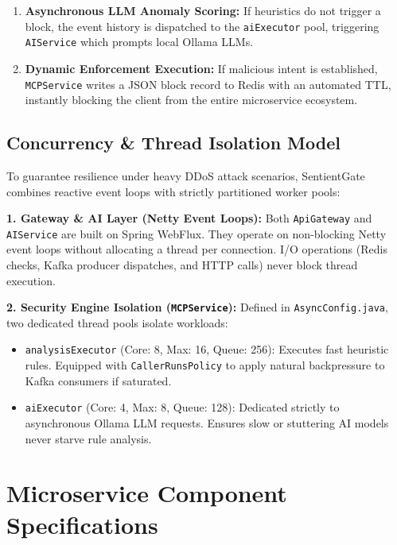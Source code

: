 \documentclass[12pt, a4paper]{article}
\newcommand{\tech}[1]{\texttt{\color{accentblue}#1}}
\newcommand{\service}[1]{\texttt{\color{accentteal}#1}}
\begin{document}
\begin{enumerate}[leftmargin=*, itemsep=5pt]
    \item \textbf{Asynchronous LLM Anomaly Scoring:} If heuristics do not trigger a block, the event history is dispatched to the \texttt{aiExecutor} pool, triggering \service{AIService} which prompts local Ollama LLMs.
    \item \textbf{Dynamic Enforcement Execution:} If malicious intent is established, \service{MCPService} writes a JSON block record to Redis with an automated TTL, instantly blocking the client from the entire microservice ecosystem.
\end{enumerate}

\subsection{Concurrency \& Thread Isolation Model}

To guarantee resilience under heavy DDoS attack scenarios, SentientGate combines reactive event loops with strictly partitioned worker pools:

\begin{tcolorbox}[solutionbox]
\textbf{1. Gateway \& AI Layer (Netty Event Loops):}
Both \service{ApiGateway} and \service{AIService} are built on Spring WebFlux. They operate on non-blocking Netty event loops without allocating a thread per connection. I/O operations (Redis checks, Kafka producer dispatches, and HTTP calls) never block thread execution.

\textbf{2. Security Engine Isolation (\service{MCPService}):}
Defined in \tech{AsyncConfig.java}, two dedicated thread pools isolate workloads:
\begin{itemize}[noitemsep]
    \item \texttt{analysisExecutor} (Core: 8, Max: 16, Queue: 256): Executes fast heuristic rules. Equipped with \texttt{CallerRunsPolicy} to apply natural backpressure to Kafka consumers if saturated.
    \item \texttt{aiExecutor} (Core: 4, Max: 8, Queue: 128): Dedicated strictly to asynchronous Ollama LLM requests. Ensures slow or stuttering AI models never starve rule analysis.
\end{itemize}
\end{tcolorbox}

\newpage
\section{Microservice Component Specifications}
\end{document}
